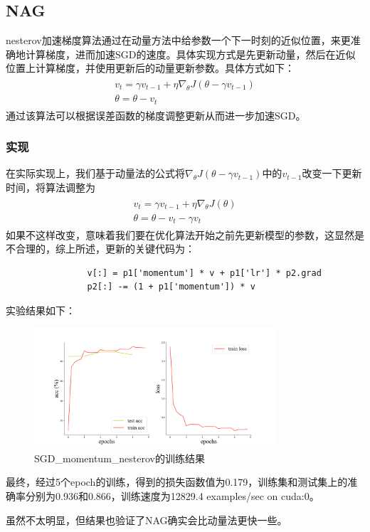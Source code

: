 \documentclass[10.5pt,a4paper]{article}%
\begin{document}
        \subsection{NAG}
            nesterov加速梯度\cite{nagsgd}算法通过在动量方法中给参数一个下一时刻的近似位置，来更准确地计算梯度，进而加速SGD的速度。具体实现方式是先更新动量，然后在近似位置上计算梯度，并使用更新后的动量更新参数。具体方式如下：
            \begin{align*}
                \begin{array}{l}v_t=\gamma v_{t-1}+\eta\nabla_\theta J(\theta-\gamma v_{t-1})\\ \theta=\theta-v_t\end{array}
            \end{align*}
            通过该算法可以根据误差函数的梯度调整更新从而进一步加速SGD。
            \subsubsection{实现}
            在实际实现上，我们基于动量法的公式将$\nabla_\theta J(\theta-\gamma v_{t-1})\text{中的}v_{t-1}$改变一下更新时间，将算法调整为
            \begin{align*}
                \begin{array}{l}v_t=\gamma v_{t-1}+\eta\nabla_\theta J(\theta)\\ \theta=\theta-v_t-\gamma v_{t}\end{array}
            \end{align*}
            如果不这样改变，意味着我们要在优化算法开始之前先更新模型的参数，这显然是不合理的，综上所述，更新的关键代码为：
            \begin{lstlisting}
                v[:] = p1['momentum'] * v + p1['lr'] * p2.grad
                p2[:] -= (1 + p1['momentum']) * v
            \end{lstlisting}\par
            实验结果如下：
            \begin{figure}[H]
            \centering
                \includegraphics[width=0.8\textwidth]{imgs_5e/SGD_momentum_nesterov.png}
              \caption{SGD\_momentum\_nesterov的训练结果}
              \label{fig:SGD_m_n}
            \end{figure} 
            最终，经过5个epoch的训练，得到的损失函数值为0.179，训练集和测试集上的准确率分别为0.936和0.866，训练速度为12829.4 examples/sec on cuda:0。\par
            虽然不太明显，但结果也验证了NAG确实会比动量法更快一些。
\end{document}
